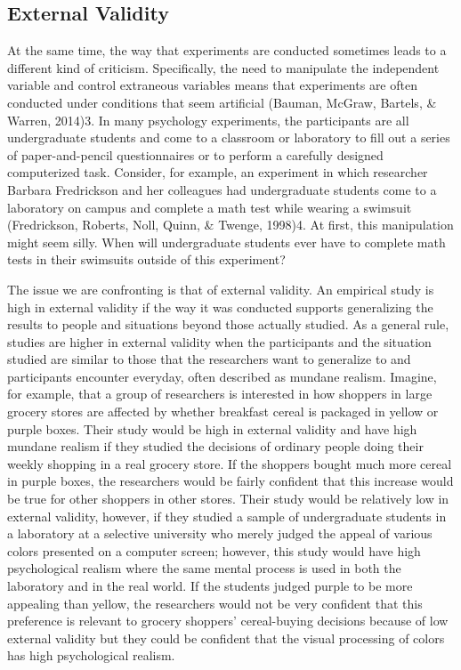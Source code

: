  \subsection{External Validity}
 
 
At the same time, the way that experiments are conducted sometimes leads to a different kind of criticism. Specifically, the need to manipulate the independent variable and control extraneous variables means that experiments are often conducted under conditions that seem artificial (Bauman, McGraw, Bartels, \& Warren, 2014)3. In many psychology experiments, the participants are all undergraduate students and come to a classroom or laboratory to fill out a series of paper-and-pencil questionnaires or to perform a carefully designed computerized task. Consider, for example, an experiment in which researcher Barbara Fredrickson and her colleagues had undergraduate students come to a laboratory on campus and complete a math test while wearing a swimsuit (Fredrickson, Roberts, Noll, Quinn, \& Twenge, 1998)4. At first, this manipulation might seem silly. When will undergraduate students ever have to complete math tests in their swimsuits outside of this experiment?
 
 
The issue we are confronting is that of external validity. An empirical study is high in external validity if the way it was conducted supports generalizing the results to people and situations beyond those actually studied. As a general rule, studies are higher in external validity when the participants and the situation studied are similar to those that the researchers want to generalize to and participants encounter everyday, often described as mundane realism. Imagine, for example, that a group of researchers is interested in how shoppers in large grocery stores are affected by whether breakfast cereal is packaged in yellow or purple boxes. Their study would be high in external
validity and have high mundane realism if they studied the decisions of ordinary people doing their weekly shopping in a real grocery store. If the shoppers bought much more cereal in purple boxes, the researchers would be fairly confident that this increase would be true for other shoppers in other stores. Their study would be relatively low in external validity, however, if they studied a sample of undergraduate students in a laboratory at a selective university who merely judged the appeal of various colors presented on a computer screen; however, this study would have high psychological realism where the same mental process is used in both the laboratory and in the real world. If the students judged purple to be more appealing than yellow, the researchers would not be very confident that this preference is relevant to grocery shoppers' cereal-buying decisions because of low external validity but they could be confident that the visual processing of colors has high psychological realism.
 
